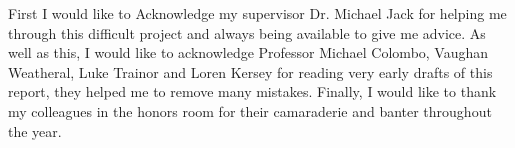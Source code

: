 \noindent First I would like to Acknowledge my supervisor Dr. Michael Jack for helping me through this difficult project and always being available to give me advice. As well as this, I would like to acknowledge Professor Michael Colombo, Vaughan Weatheral, Luke Trainor and Loren Kersey for reading very early drafts of this report, they helped me to remove many mistakes. Finally, I would like to thank my colleagues in the honors room for their camaraderie and banter throughout the year.
